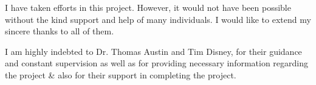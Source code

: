 I have taken efforts in this project. However, it would not have been possible without the kind support 
and help of many individuals. I would like to extend my sincere thanks to all of them.

I am highly indebted to Dr. Thomas Austin and Tim Disney, for their guidance and constant supervision as well as for providing necessary information regarding the project \& also for their support in completing the project.